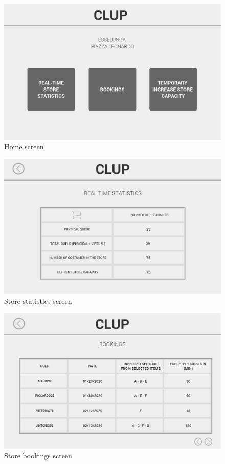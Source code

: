 \documentclass[]{article}
\begin{document}
			\begin{figure}[H]
				\centering
				\includegraphics[scale=0.3]{Mockups/webAppHome}
				\caption{Home screen}
				\label{fig:homeScreen}
			\end{figure}
			\bigskip
			
			\begin{figure}[H]
				\centering
				\includegraphics[scale=0.489]{Mockups/storeStatistics}
				\caption{Store statistics screen}
				\label{fig:Storestatisticsscreen}
			\end{figure}
		
			
			\begin{figure}[H]
				\centering
				\includegraphics[scale=0.3]{Mockups/storeBookings}
				\caption{Store bookings screen}
				\label{fig:ManagerHomeMockup}
			\end{figure}
		
\end{document}
